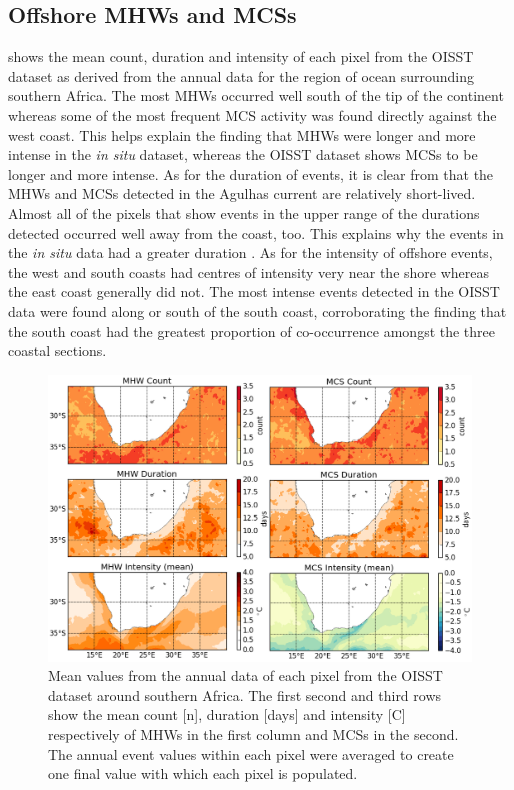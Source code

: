 \documentclass[a4paper,10pt,review]{elsarticle}
\begin{document}
\subsection{Offshore MHWs and MCSs}
 shows the mean count, duration and intensity of each pixel from the OISST dataset as derived from the annual data for the region of ocean surrounding southern Africa. The most MHWs occurred well south of the tip of the continent whereas some of the most frequent MCS activity was found directly against the west coast. This helps explain the finding that MHWs were longer and more intense in the \emph{in situ} dataset, whereas the OISST dataset shows MCSs to be longer and more intense. As for the duration of events, it is clear from  that the MHWs and MCSs detected in the Agulhas current are relatively short-lived. Almost all of the pixels that show events in the upper range of the durations detected occurred well away from the coast, too. This explains why the events in the \emph{in situ} data had a greater duration . As for the intensity of offshore events, the west and south coasts had centres of intensity very near the shore whereas the east coast generally did not. The most intense events detected in the OISST data were found along or south of the south coast, corroborating the finding that the south coast had the greatest proportion of co-occurrence amongst the three coastal sections.

\begin{figure}
\centering \includegraphics[width=1.0\textwidth]{MHW_MCS_mean.png}
\caption{Mean values from the annual data of each pixel from the OISST dataset around southern Africa. The first second and third rows show the mean count [n], duration [days] and intensity [\degree C] respectively of MHWs in the first column and MCSs in the second. The annual event values within each pixel were averaged to create one final value with which each pixel is populated.}
\label{fig:Figure6}
\end{figure}
\end{document}
